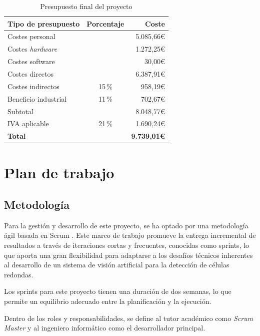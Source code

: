 \documentclass[12pt,a4paper,onecolumn,oneside]{report}
\begin{document}
\begin{table}[H]
\caption{Presupuesto final del proyecto}
\centering
\renewcommand{\arraystretch}{1.25}
\begin{tabular}{lcr}
\hline
\textbf{Tipo de presupuesto} & \textbf{Porcentaje} & \textbf{Coste} \\
\hline
Costes personal                 &          & 5.085,66\euro{} \\
Costes \textit{hardware}        &          & 1.272,25\euro{} \\
Costes software                 &          & 30,00\euro{} \\
\hline
Costes directos       &          & 6.387,91\euro{} \\
Costes indirectos     & 15\,\%   & 958,19\euro{} \\
Beneficio industrial  & 11\,\%   & 702,67\euro{} \\
\hline
Subtotal              &          & 8.048,77\euro{} \\
IVA aplicable         & 21\,\%   & 1.690,24\euro{} \\
\hline
\textbf{Total}        &          & \textbf{9.739,01\euro{}} \\
\hline
\end{tabular}
\label{tab:presupuesto_final}
\end{table}

\section{Plan de trabajo}
\label{Plan de trabajo}

\subsection{Metodología}
\label{Metodología}

Para la gestión y desarrollo de este proyecto, se ha optado por una metodología ágil basada en Scrum \cite{scrum_org_what_is_scrum}.
Este marco de trabajo promueve la entrega incremental de resultados a través de iteraciones cortas y frecuentes, conocidas como sprints, 
lo que aporta una gran flexibilidad para adaptarse a los desafíos técnicos inherentes al desarrollo de un sistema de visión artificial 
para la detección de células redondas.

Los sprints para este proyecto tienen una duración de dos semanas, lo que permite un equilibrio adecuado entre la planificación y la ejecución.

Dentro de los roles y responsabilidades, se define al tutor académico como \textit{Scrum Master} y al ingeniero informático como el desarrollador principal.
\end{document}
